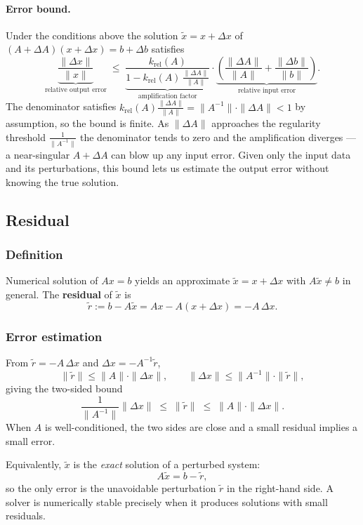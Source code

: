 \documentclass{article}
\begin{document}
\paragraph{Error bound.}
Under the conditions above the solution $\tilde{x} = x + \Delta x$ of
$(A + \Delta A)(x + \Delta x) = b + \Delta b$ satisfies
\[
  \underbrace{\frac{\|\Delta x\|}{\|x\|}}_{\text{relative output error}}
  \;\leq\;
  \underbrace{\frac{k_{\mathrm{rel}}(A)}{1 - k_{\mathrm{rel}}(A)\,\tfrac{\|\Delta A\|}{\|A\|}}}_{\text{amplification factor}}
  \cdot
  \underbrace{\left(\frac{\|\Delta A\|}{\|A\|}
              + \frac{\|\Delta b\|}{\|b\|}\right)}_{\text{relative input error}}.
\]
The denominator satisfies
$k_{\mathrm{rel}}(A)\tfrac{\|\Delta A\|}{\|A\|}
 = \|A^{-1}\|\cdot\|\Delta A\| < 1$
by assumption, so the bound is finite.
As $\|\Delta A\|$ approaches the regularity threshold $\tfrac{1}{\|A^{-1}\|}$
the denominator tends to zero and the amplification diverges --- a
near-singular $A + \Delta A$ can blow up any input error.
Given only the input data and its perturbations, this bound lets us
estimate the output error without knowing the true solution.

\subsection{Residual}
\subsubsection{Definition}

Numerical solution of $Ax = b$ yields an approximate $\tilde{x} = x + \Delta x$
with $A\tilde{x} \neq b$ in general.  The \textbf{residual} of $\tilde{x}$ is
\[
  \tilde{r} := b - A\tilde{x} = Ax - A(x + \Delta x) = -A\,\Delta x.
\]

\subsubsection{Error estimation}

From $\tilde{r} = -A\,\Delta x$ and $\Delta x = -A^{-1}\tilde{r}$,
\[
  \|\tilde{r}\| \leq \|A\|\cdot\|\Delta x\|,
  \qquad
  \|\Delta x\| \leq \|A^{-1}\|\cdot\|\tilde{r}\|,
\]
giving the two-sided bound
\[
  \frac{1}{\|A^{-1}\|}\|\Delta x\|
  \;\leq\; \|\tilde{r}\|
  \;\leq\; \|A\|\cdot\|\Delta x\|.
\]
When $A$ is well-conditioned, the two sides are close and a small residual
implies a small error.

Equivalently, $\tilde{x}$ is the \emph{exact} solution of a perturbed system:
\[
  A\tilde{x} = b - \tilde{r},
\]
so the only error is the unavoidable perturbation $\tilde{r}$ in the
right-hand side.  A solver is numerically stable precisely when it produces
solutions with small residuals.
\end{document}
